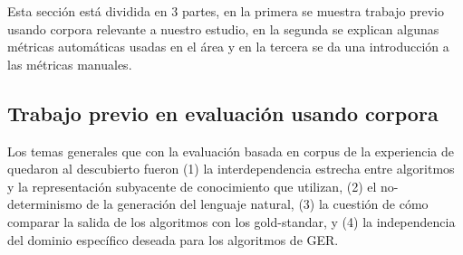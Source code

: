 \label{sec:metricas_evaluacion}

Esta secci\'on est\'a dividida en 3 partes, en la primera se muestra trabajo previo usando corpora relevante a nuestro estudio, en la segunda se explican algunas m\'etricas autom\'aticas usadas en el \'area y en la tercera se da una introducci\'on a las m\'etricas manuales.

\subsection{Trabajo previo en evaluaci\'on usando corpora}\label{sec:2_3_1}

Los temas generales que con la evaluaci\'on basada en corpus de la experiencia de \cite{viet:gene11} quedaron
al descubierto fueron (1) la interdependencia estrecha entre algoritmos y la
representaci\'on subyacente de conocimiento que utilizan, (2) el no-determinismo de la generaci\'on del lenguaje natural, 
(3) la cuesti\'on de c\'omo comparar la salida de los algoritmos con los gold-standar, y (4) la independencia del dominio espec\'ifico deseada para los algoritmos de GER.

